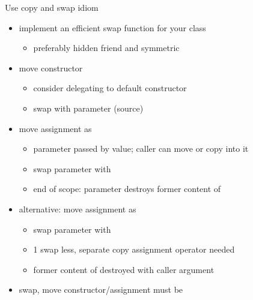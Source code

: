 \begin{frame}[fragile]
  \begin{block}{Use copy and swap idiom}
    \begin{itemize}
    \item implement an efficient swap function for your class
      \begin{itemize}
      \item preferably hidden friend and symmetric
      \end{itemize}
    \item move constructor
      \begin{itemize}
      \item consider delegating to default constructor
      \item swap  with parameter (source)
      \end{itemize}
    \item move assignment as 
      \begin{itemize}
      \item parameter passed by value; caller can move or copy into it
      \item swap parameter with 
      \item end of scope: parameter destroys former content of 
      \end{itemize}
    \item alternative: move assignment as 
      \begin{itemize}
      \item swap parameter with 
      \item 1 swap less, separate copy assignment operator needed
      \item former content of  destroyed with caller argument
      \end{itemize}
    \item swap, move constructor/assignment must be 
    \end{itemize}
  \end{block}
\end{frame}

